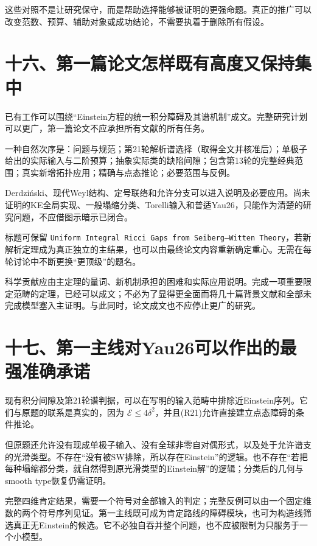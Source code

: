 \documentclass[
  11pt,
  a4paper,
  fontset=none]{ctexart}
\begin{document}
这些对照不是让研究保守，而是帮助选择能够被证明的更强命题。真正的推广可以改变范数、预算、辅助对象或成功结论，不需要执着于删除所有假设。

\section{十六、第一篇论文怎样既有高度又保持集中}\label{ux5341ux516dux7b2cux4e00ux7bc7ux8bbaux6587ux600eux6837ux65e2ux6709ux9ad8ux5ea6ux53c8ux4fddux6301ux96c6ux4e2d}

已有工作可以围绕``Einstein方程的统一积分障碍及其谱机制''成文。完整研究计划可以更广，第一篇论文不应承担所有文献的所有任务。

一种自然次序是：问题与规范；第21轮解析谱选择（取得全文并核准后）；单极子给出的实际输入与二阶预算；抽象实际类的缺陷间隙；包含第13轮的完整经典范围；真实新增拓扑应用；精确与点态推论；必要范围与反例。

Derdziński、现代Weyl结构、定号联络和允许分支可以进入说明及必要应用。尚未证明的KE全局实现、一般塌缩分类、Torelli输入和普适Yau26，只能作为清楚的研究问题，不应借图示暗示已闭合。

标题可保留
\nolinkurl{Uniform Integral Ricci Gaps from Seiberg–Witten Theory}，若新解析定理成为真正独立的主结果，也可以由最终论文内容重新确定重心。无需在每轮讨论中不断更换``更顶级''的题名。

科学贡献应由主定理的量词、新机制承担的困难和实际应用说明。完成一项重要限定范畴的定理，已经可以成文；不必为了显得更全面而将几十篇背景文献和全部未完成模型塞入主证明。与此同时，论文成文也不应停止更广的研究。

\section{十七、第一主线对Yau26可以作出的最强准确承诺}\label{ux5341ux4e03ux7b2cux4e00ux4e3bux7ebfux5bf9yau26ux53efux4ee5ux4f5cux51faux7684ux6700ux5f3aux51c6ux786eux627fux8bfa}

现有积分间隙及第21轮谱判据，可以在写明的输入范畴中排除近Einstein序列。它们与原题的联系是真实的，因为
\(\mathcal E\le4\delta^2\)，并且(R21)允许直接建立点态障碍的条件推论。

但原题还允许没有现成单极子输入、没有全球非零自对偶形式，以及处于允许谱支的光滑类型。不存在``没有被SW排除，所以存在Einstein''的逻辑。也不存在``若把每种塌缩都分类，就自然得到原光滑类型的Einstein解''的逻辑；分类后的几何与smooth
type恢复仍需证明。

完整四维肯定结果，需要一个符号对全部输入的判定；完整反例可以由一个固定维数的两个符号序列见证。第一主线既可成为肯定路线的障碍模块，也可为构造线筛选真正无Einstein的候选。它不必独自吞并整个问题，也不应被限制为只服务于一个小模型。
\end{document}
